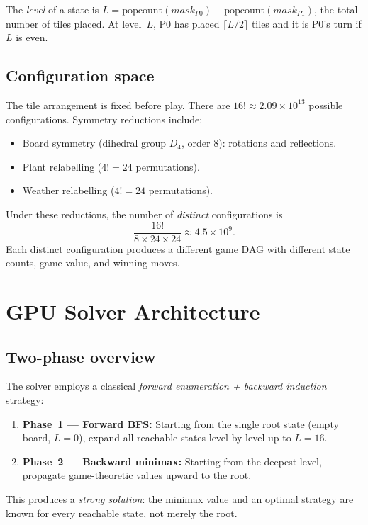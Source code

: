 \documentclass[11pt,a4paper]{article}
\begin{document}
The \emph{level} of a state is $L = \mathrm{popcount}(\mathit{mask}_{P0}) +
\mathrm{popcount}(\mathit{mask}_{P1})$, the total number of tiles placed.
At level~$L$, P0 has placed $\lceil L/2 \rceil$ tiles and it is P0's turn
if $L$ is even.

\subsection{Configuration space}

The tile arrangement is fixed before play.  There are $16!
\approx 2.09 \times 10^{13}$ possible configurations.  Symmetry reductions
include:
\begin{itemize}
  \item Board symmetry (dihedral group $D_4$, order 8): rotations and
    reflections.
  \item Plant relabelling ($4! = 24$ permutations).
  \item Weather relabelling ($4! = 24$ permutations).
\end{itemize}
Under these reductions, the number of \emph{distinct} configurations is
\[
  \frac{16!}{8 \times 24 \times 24} \approx 4.5 \times 10^{9}.
\]
Each distinct configuration produces a different game DAG with different
state counts, game value, and winning moves.

\section{GPU Solver Architecture}

\subsection{Two-phase overview}

The solver employs a classical \emph{forward enumeration + backward
induction} strategy:
\begin{enumerate}
  \item \textbf{Phase~1 --- Forward BFS:} Starting from the single root
    state (empty board, $L{=}0$), expand all reachable states level by level
    up to $L{=}16$.
  \item \textbf{Phase~2 --- Backward minimax:} Starting from the deepest
    level, propagate game-theoretic values upward to the root.
\end{enumerate}
This produces a \emph{strong solution}: the minimax value and an optimal
strategy are known for every reachable state, not merely the root.
\end{document}
